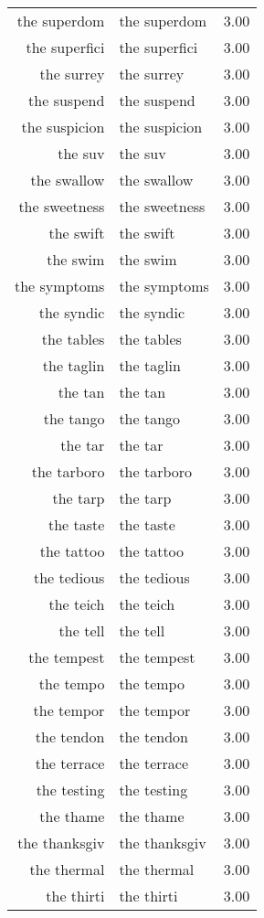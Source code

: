\begin{table}[ht]
\begin{tabular}{rlr}
  the superdom & the superdom & 3.00 \\ 
  the superfici & the superfici & 3.00 \\ 
  the surrey & the surrey & 3.00 \\ 
  the suspend & the suspend & 3.00 \\ 
  the suspicion & the suspicion & 3.00 \\ 
  the suv & the suv & 3.00 \\ 
  the swallow & the swallow & 3.00 \\ 
  the sweetness & the sweetness & 3.00 \\ 
  the swift & the swift & 3.00 \\ 
  the swim & the swim & 3.00 \\ 
  the symptoms & the symptoms & 3.00 \\ 
  the syndic & the syndic & 3.00 \\ 
  the tables & the tables & 3.00 \\ 
  the taglin & the taglin & 3.00 \\ 
  the tan & the tan & 3.00 \\ 
  the tango & the tango & 3.00 \\ 
  the tar & the tar & 3.00 \\ 
  the tarboro & the tarboro & 3.00 \\ 
  the tarp & the tarp & 3.00 \\ 
  the taste & the taste & 3.00 \\ 
  the tattoo & the tattoo & 3.00 \\ 
  the tedious & the tedious & 3.00 \\ 
  the teich & the teich & 3.00 \\ 
  the tell & the tell & 3.00 \\ 
  the tempest & the tempest & 3.00 \\ 
  the tempo & the tempo & 3.00 \\ 
  the tempor & the tempor & 3.00 \\ 
  the tendon & the tendon & 3.00 \\ 
  the terrace & the terrace & 3.00 \\ 
  the testing & the testing & 3.00 \\ 
  the thame & the thame & 3.00 \\ 
  the thanksgiv & the thanksgiv & 3.00 \\ 
  the thermal & the thermal & 3.00 \\ 
  the thirti & the thirti & 3.00 \\ 

\end{tabular}
\end{table}

